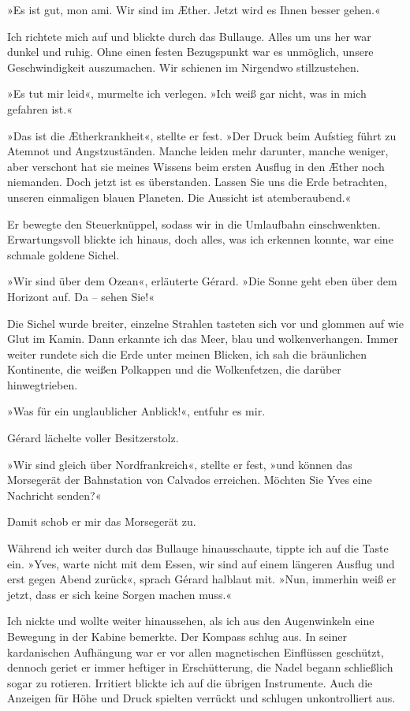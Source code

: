»Es ist gut, mon ami. Wir sind im Æther. Jetzt wird es Ihnen besser
gehen.«

Ich richtete mich auf und blickte durch das Bullauge. Alles um uns
her war dunkel und ruhig. Ohne einen festen Bezugspunkt war es
unmöglich, unsere Geschwindigkeit auszumachen. Wir schienen im
Nirgendwo stillzustehen.

»Es tut mir leid«, murmelte ich verlegen. »Ich weiß gar nicht, was
in mich gefahren ist.«

»Das ist die Ætherkrankheit«, stellte er fest. »Der Druck beim
Aufstieg führt zu Atemnot und Angstzuständen. Manche leiden mehr
darunter, manche weniger, aber verschont hat sie meines Wissens
beim ersten Ausflug in den Æther noch niemanden. Doch jetzt ist es
überstanden. Lassen Sie uns die Erde betrachten, unseren einmaligen
blauen Planeten. Die Aussicht ist atemberaubend.«

Er bewegte den Steuerknüppel, sodass wir in die Umlaufbahn
einschwenkten. Erwartungsvoll blickte ich hinaus, doch alles, was
ich erkennen konnte, war eine schmale goldene Sichel.

»Wir sind über dem Ozean«, erläuterte Gérard. »Die Sonne geht eben
über dem Horizont auf. Da – sehen Sie!«

Die Sichel wurde breiter, einzelne Strahlen tasteten sich vor und
glommen auf wie Glut im Kamin. Dann erkannte ich das Meer, blau und
wolkenverhangen. Immer weiter rundete sich die Erde unter meinen
Blicken, ich sah die bräunlichen Kontinente, die weißen Polkappen
und die Wolkenfetzen, die darüber hinwegtrieben.

»Was für ein unglaublicher Anblick!«, entfuhr es mir.

Gérard lächelte voller Besitzerstolz.

»Wir sind gleich über Nordfrankreich«, stellte er fest, »und können
das Morsegerät der Bahnstation von Calvados erreichen. Möchten Sie
Yves eine Nachricht senden?«

Damit schob er mir das Morsegerät zu.

Während ich weiter durch das Bullauge hinausschaute, tippte ich auf
die Taste ein. »Yves, warte nicht mit dem Essen, wir sind auf einem
längeren Ausflug und erst gegen Abend zurück«, sprach Gérard
halblaut mit. »Nun, immerhin weiß er jetzt, dass er sich keine
Sorgen machen muss.«

Ich nickte und wollte weiter hinaussehen, als ich aus den
Augenwinkeln eine Bewegung in der Kabine bemerkte. Der Kompass
schlug aus. In seiner kardanischen Aufhängung war er vor allen
magnetischen Einflüssen geschützt, dennoch geriet er immer heftiger
in Erschütterung, die Nadel begann schließlich sogar zu rotieren.
Irritiert blickte ich auf die übrigen Instrumente. Auch die
Anzeigen für Höhe und Druck spielten verrückt und schlugen
unkontrolliert aus.


